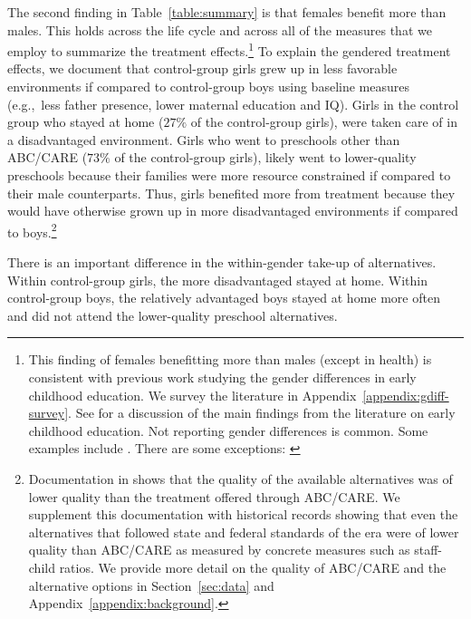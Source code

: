 The second finding in Table~\ref{table:summary} is that females benefit more than males. This holds across the life cycle and across all of the measures that we employ to summarize the treatment effects.\footnote{This finding of females benefitting more than males (except in health) is consistent with previous work studying the gender differences in early childhood education. We survey the literature in Appendix~\ref{appendix:gdiff-survey}. See \citet{Elango_Hojman_etal_2016_Early-Edu} for a discussion of the main findings from the literature on early childhood education. Not reporting gender differences is common. Some examples include \citet{Bernal_Keane_2011_JoLE,Cascio_Schanzenbach_2013_ImpactsExpandingAccess,Bitler_et_al_2014_Head_Start_Unpublished,Kline_Walters_2016_QJE}. There are some exceptions: \citet{Anderson_2008_JASA,Heckman_Moon_etal_2010_QE,Campbell_Conti_etal_2014_EarlyChildhoodInvestments,Garcia_Heckman_Leaf_etal_2017_Comp_CBA_Unpublished}} To explain the gendered treatment effects, we document that control-group girls grew up in less favorable environments if compared to control-group boys using baseline measures (e.g.,\ less father presence, lower maternal education and IQ). Girls in the control group who stayed at home ($27\%$ of the control-group girls), were taken care of in a disadvantaged environment. Girls who went to preschools other than ABC/CARE ($73\%$ of the control-group girls), likely went to lower-quality preschools because their families were more resource constrained if compared to their male counterparts. Thus, girls benefited more from treatment because they would have otherwise grown up in more disadvantaged environments if compared to boys.\footnote{Documentation in \citet{Burchinal_etal_1989_CD_Daycare-Pre-K-Dev} shows that the quality of the available alternatives was of lower quality than the treatment offered through ABC/CARE. We supplement this documentation with historical records showing that even the alternatives that followed state and federal standards of the era were of lower quality than ABC/CARE as measured by concrete measures such as staff-child ratios. We provide more detail on the quality of ABC/CARE and the alternative options in Section~\ref{sec:data} and Appendix~\ref{appendix:background}.}

There is an important difference in the within-gender take-up of alternatives. Within control-group girls, the more disadvantaged stayed at home. Within control-group boys, the relatively advantaged boys stayed at home more often and did not attend the lower-quality preschool alternatives. 

